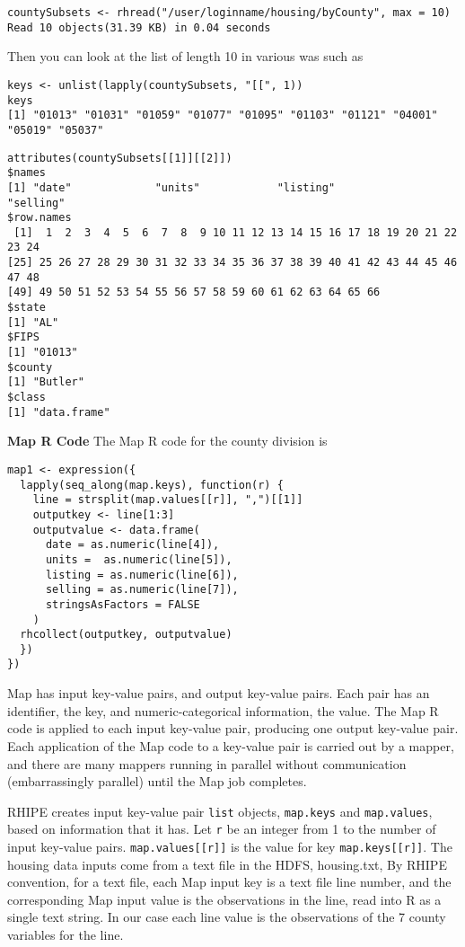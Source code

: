 \begin{verbatim}
countySubsets <- rhread("/user/loginname/housing/byCounty", max = 10)
Read 10 objects(31.39 KB) in 0.04 seconds
\end{verbatim}

Then you can look at the list of length 10 in various was such as

\begin{verbatim}
keys <- unlist(lapply(countySubsets, "[[", 1))
keys
[1] "01013" "01031" "01059" "01077" "01095" "01103" "01121" "04001" "05019" "05037"
\end{verbatim}

\begin{verbatim}
attributes(countySubsets[[1]][[2]])
$names
[1] "date"             "units"            "listing"             "selling"
$row.names
 [1]  1  2  3  4  5  6  7  8  9 10 11 12 13 14 15 16 17 18 19 20 21 22 23 24
[25] 25 26 27 28 29 30 31 32 33 34 35 36 37 38 39 40 41 42 43 44 45 46 47 48
[49] 49 50 51 52 53 54 55 56 57 58 59 60 61 62 63 64 65 66
$state
[1] "AL"
$FIPS
[1] "01013"
$county
[1] "Butler"
$class
[1] "data.frame"
\end{verbatim}

\textbf{Map R Code}
The Map R code for the county division is

\begin{verbatim}
map1 <- expression({
  lapply(seq_along(map.keys), function(r) {
    line = strsplit(map.values[[r]], ",")[[1]]
    outputkey <- line[1:3]
    outputvalue <- data.frame(
      date = as.numeric(line[4]),
      units =  as.numeric(line[5]),
      listing = as.numeric(line[6]),
      selling = as.numeric(line[7]),
      stringsAsFactors = FALSE
    )
  rhcollect(outputkey, outputvalue)
  })
})
\end{verbatim}

Map has input key-value pairs, and output key-value pairs. Each pair has an
identifier, the key, and numeric-categorical information, the value.
The Map R code is applied to each input key-value pair, producing one
output key-value pair. Each application of the Map code to a
key-value pair is carried out by a mapper, and there are many mappers running
in parallel without communication (embarrassingly parallel) until the Map job
completes.

RHIPE creates input key-value pair \texttt{list} objects, \texttt{map.keys} and
\texttt{map.values}, based on information that it has.
Let \texttt{r} be an integer from 1 to the number of input key-value pairs.
\texttt{map.values[[r]]} is the value for key \texttt{map.keys[[r]]}.
The housing data inputs come from a text file in the HDFS, housing.txt,
By RHIPE convention, for a text file, each Map input key is a text file line
number, and the corresponding  Map input value is the observations in the line,
read into R as a single text string.
In our case each line value is the observations of the 7 county variables for the line.

